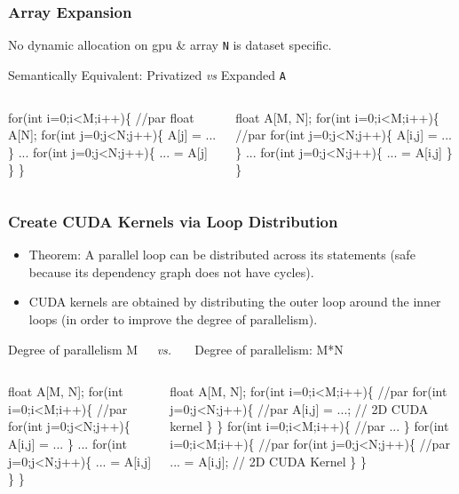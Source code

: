 \documentclass{beamer}
\newcommand{\emp}[1]{\textcolor{DikuRed}{ #1}}
\newcommand{\emphh}[1]{\textcolor{CosGreen}{ #1}}
\begin{document}
\begin{frame}[fragile,t]
  \frametitle{Array Expansion} %

No dynamic allocation on {\sc gpu} \& array {\tt N} is dataset specific.\smallskip

\begin{block}{Semantically Equivalent: Privatized {\em vs} Expanded {\tt A}}
\begin{columns}
\begin{colorcode}
\emphh{for(int i=0;i<M;i++)\{ //par}
  \emp{float A[N];}
  for(int j=0;j<N;j++)\{
    \emp{A[j]} = ...
  \}
  ...
  for(int j=0;j<N;j++)\{
    ... = \emp{A[j]}
  \}  
\}
\end{colorcode}
\begin{colorcode}
\emphh{float A[M, N];}
\emphh{for(int i=0;i<M;i++)\{ //par}
  for(int j=0;j<N;j++)\{
    \emphh{A[i,j]} = ...
  \}
  ...
  for(int j=0;j<N;j++)\{
    ... = \emphh{A[i,j]}
  \}  
\}
\end{colorcode}
\end{columns}
\end{block} 

\end{frame}


\begin{frame}[fragile,t]
  \frametitle{Create CUDA Kernels via Loop Distribution} %


\begin{itemize}
\item \emp{Theorem:} A parallel loop can be distributed across
                its statements (safe because its
                dependency graph does not have cycles).\smallskip

\item CUDA kernels are obtained by distributing the outer loop 
                around the inner loops (in order to improve
                the degree of parallelism). 
\end{itemize}

\begin{block}{Degree of parallelism M{\tt~~~}{\em vs.}{\tt~~~} Degree of parallelism: M*N}
\begin{columns}
\begin{colorcode}
\emphh{float A[M, N];}
\emphh{for(int i=0;i<M;i++)\{ //par}
  for(int j=0;j<N;j++)\{
    A[i,j] = ...
  \}
  ...
  for(int j=0;j<N;j++)\{
    ... = A[i,j]
  \}  
\}
\end{colorcode}
\begin{colorcode}
\emphh{float A[M, N];}
\emphh{for(int i=0;i<M;i++)\{ //par}
  \emphh{for(int j=0;j<N;j++)\{ //par}
    A[i,j] = ...; \emp{// 2D CUDA kernel}
\} \}
\emphh{for(int i=0;i<M;i++)\{ //par}
  ...
\}
\emphh{for(int i=0;i<M;i++)\{ //par}
  \emphh{for(int j=0;j<N;j++)\{ //par}
    ... = A[i,j]; \emp{// 2D CUDA Kernel}
\} \}
\end{colorcode}
\end{columns}
\end{block} 

\end{frame}
\end{document}
